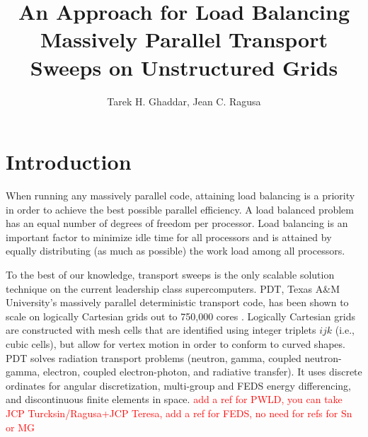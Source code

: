 \documentclass{anstrans}
\title{An Approach for Load Balancing Massively Parallel Transport Sweeps on Unstructured Grids}
\author{Tarek H. Ghaddar, Jean C. Ragusa}
\institute{
Dept. of Nuclear Engineering, Texas A\&M University, College Station, TX, 77843-3133
}
\newcommand{\tcr}[1]{\textcolor{red}{#1}}
\begin{document}
\vspace*{-42pt}
\begin{strip}
\vspace*{14pt}
\end{strip}


\section{Introduction}
When running any massively parallel code, attaining load balancing is a priority in order to achieve the best possible parallel efficiency. A load balanced problem has an equal number of degrees of freedom per processor. Load balancing is an important factor to minimize idle time for all processors and is attained by equally distributing (as much as possible) the work load among all processors. 

To the best of our knowledge, transport sweeps is the only scalable solution technique on the current leadership class supercomputers. PDT, Texas A\&M University's massively parallel deterministic transport code, has been shown to scale on logically Cartesian grids out to 750,000 cores \cite{mpadams2015}. Logically Cartesian grids are constructed with mesh cells that are identified using integer triplets $ijk$ (i.e., cubic cells), but allow for vertex motion in order to conform to curved shapes. PDT solves radiation transport problems (neutron, gamma, coupled neutron-gamma, electron, coupled electron-photon, and radiative transfer). It uses discrete ordinates for angular discretization\cite{pwld_ragusa,pwld_teresa}, multi-group and FEDS\cite{feds} energy differencing, and discontinuous finite elements in space.  \tcr{add a ref for PWLD, you can take JCP Turcksin/Ragusa+JCP Teresa, add a ref for FEDS, no need for refs for Sn or MG}
\end{document}
